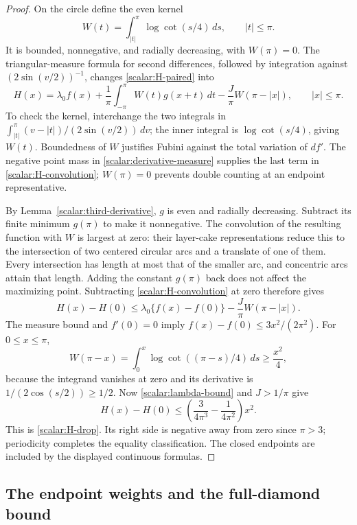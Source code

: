\begin{proof}
On the circle define the even kernel
\[
 W(t)=\int_{|t|}^{\pi}\log\cot(s/4)\,ds,
 \qquad |t|\leq\pi.
\]
It is bounded, nonnegative, and radially decreasing, with $W(\pi)=0$.
The triangular-measure formula for second differences, followed by
integration against $(2\sin(v/2))^{-1}$, changes
\eqref{scalar:H-paired} into
\begin{equation}\label{scalar:H-convolution}
 H(x)=\lambda_0f(x)+\frac1\pi\int_{-\pi}^{\pi}W(t)g(x+t)\,dt
                 -\frac J\pi W(\pi-|x|),\qquad |x|\leq\pi.
\end{equation}
To check the kernel, interchange the two integrals in
$\int_{|t|}^{\pi}(v-|t|)/(2\sin(v/2))\,dv$; the inner integral is
$\log\cot(s/4)$, giving $W(t)$.  Boundedness of $W$ justifies Fubini
against the total variation of $df'$.  The negative point mass in
\eqref{scalar:derivative-measure} supplies the last term in
\eqref{scalar:H-convolution}; $W(\pi)=0$ prevents double counting at
an endpoint representative.

By Lemma~\ref{scalar:third-derivative}, $g$ is even and radially
decreasing.  Subtract its finite minimum $g(\pi)$ to make it
nonnegative.  The convolution of the resulting function with $W$
is largest at zero: their layer-cake representations reduce this to
the intersection of two centered circular arcs and a translate of
one of them.  Every intersection has length at most that of the
smaller arc, and concentric arcs attain that length.  Adding the
constant $g(\pi)$ back does not affect the maximizing point.
Subtracting \eqref{scalar:H-convolution} at zero therefore gives
\[
 H(x)-H(0)\leq\lambda_0\{f(x)-f(0)\}
                    -\frac J\pi W(\pi-|x|).
\]
The measure bound and $f'(0)=0$ imply
$f(x)-f(0)\leq3x^2/(2\pi^2)$.  For $0\leq x\leq\pi$,
\[
 W(\pi-x)=\int_0^x\log\cot((\pi-s)/4)\,ds\geq\frac{x^2}{4},
\]
because the integrand vanishes at zero and its derivative is
$1/(2\cos(s/2))\geq1/2$.  Now
\eqref{scalar:lambda-bound} and $J>1/\pi$ give
\[
 H(x)-H(0)\leq
 \left(\frac3{4\pi^3}-\frac1{4\pi^2}\right)x^2.
\]
This is \eqref{scalar:H-drop}.  Its right side is negative away from
zero since $\pi>3$; periodicity completes the equality classification.
The closed endpoints are included by the displayed continuous formulas.
\end{proof}

\subsection{The endpoint weights and the full-diamond bound}

